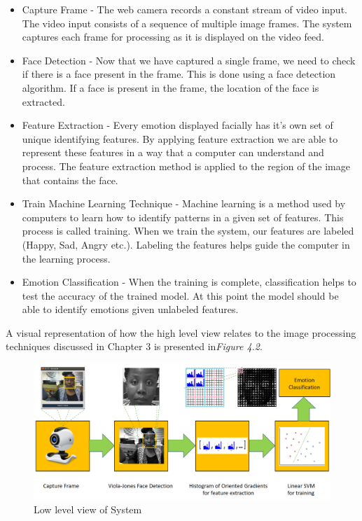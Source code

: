\begin{itemize}
  \item Capture Frame - The web camera records a constant stream of video input. The video input consists of a sequence of multiple image frames. The system captures each frame for processing as it is displayed on the video feed.

  \item Face Detection - Now that we have captured a single frame, we need to check if there is a face present in the frame. This is done using a face detection algorithm. If a face is present in the frame, the location of the face is extracted.

  \item Feature Extraction - Every emotion displayed facially has it's own set of unique identifying features. By applying feature extraction we are able to represent these features in a way that a computer can understand and process. The feature extraction method is applied to the region of the image that contains the face.

  \item Train Machine Learning Technique - Machine learning is a method used by computers to learn how to identify patterns in a given set of features. This process is called training. When we train the system, our features are labeled (Happy, Sad, Angry etc.). Labeling the features helps guide the computer in the learning process.

  \item Emotion Classification - When the training is complete, classification helps to test the accuracy of the trained model. At this point the model should be able to identify emotions given unlabeled features.
\end{itemize}
A visual representation of how the high level view relates to the image processing techniques discussed in Chapter 3 is presented in\textit{Figure 4.2}. 
\begin{figure}[H]
  \centering
  \includegraphics[scale=0.2]{pres2}
  \caption{Low level view of System}
\end{figure} 
